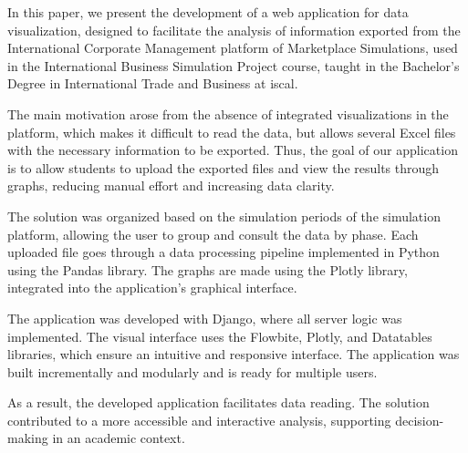 
In this paper, we present the development of a web application for data visualization, designed to facilitate the analysis of information exported from the International Corporate Management platform of Marketplace Simulations, used in the International Business Simulation Project course, taught in the Bachelor's Degree in International Trade and Business at \gls{iscal}.

The main motivation arose from the absence of integrated visualizations in the platform, which makes it difficult to read the data, but allows several Excel files with the necessary information to be exported. Thus, the goal of our application is to allow students to upload the exported files and view the results through graphs, reducing manual effort and increasing data clarity.

The solution was organized based on the simulation periods of the simulation platform, allowing the user to group and consult the data by phase. Each uploaded file goes through a data processing pipeline implemented in Python using the Pandas library. The graphs are made using the Plotly library, integrated into the application's graphical interface.

The application was developed with Django, where all server logic was implemented. The visual interface uses the Flowbite, Plotly, and Datatables libraries, which ensure an intuitive and responsive interface. The application was built incrementally and modularly and is ready for multiple users.

As a result, the developed application facilitates data reading. The solution contributed to a more accessible and interactive analysis, supporting decision-making in an academic context.